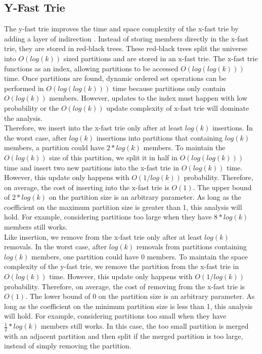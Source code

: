 \documentclass{article}
\begin{document}
\subsection{Y-Fast Trie}

\noindent
The y-fast trie improves the time and space complexity of the x-fast trie by adding a layer of indirection  \cite{WILLARD198381}. Instead of storing members directly in the x-fast trie, they are stored in red-black trees. These red-black trees split the universe into $O(log(k))$ sized partitions and are stored in an x-fast trie. The x-fast trie functions as an index, allowing partitions to be accessed $O(log(log(k)))$ time. Once partitions are found, dynamic ordered set operations can be performed in $O(log(log(k)))$ time because partitions only contain $O(log(k))$ members. However, updates to the index must happen with low probability or the $O(log(k))$ update complexity of x-fast trie will dominate the analysis.
\\

\noindent
Therefore, we insert into the x-fast trie only after at least $log(k)$ insertions. In the worst case, after $log(k)$ insertions into partitions that containing $log(k)$ members, a partition could have $2*log(k)$ members. To maintain the $O(log(k))$ size of this partition, we split it in half in $O(log(log(k)))$ time and insert two new partitions into the x-fast trie in $O(log(k))$ time. However, this update only happens with $O(1/log(k))$ probability. Therefore, on average, the cost of inserting into the x-fast trie is $O(1)$. The upper bound of $2*log(k)$ on the partition size is an arbitrary parameter. As long as the coefficient on the maximum partition size is greater than 1, this analysis will hold. For example, considering partitions too large when they have $8*log(k)$ members still works.
\\

\noindent
Like insertion, we remove from the x-fast trie only after at least $log(k)$ removals. In the worst case, after $log(k)$ removals from partitions containing $log(k)$ members, one partition could have $0$ members. To maintain the space complexity of the y-fast trie, we remove the partition from the x-fast trie in $O(log(k))$ time. However, this update only happens with $O(1/log(k))$ probability. Therefore, on average, the cost of removing from the x-fast trie is $O(1)$. The lower bound of $0$ on the partition size is an arbitrary parameter. As long as the coefficient on the minimum partition size is less than 1, this analysis will hold. For example, considering partitions too small when they have $\frac{1}{2}*log(k)$ members still works. In this case, the too small partition is merged with an adjacent partition and then split if the merged partition is too large, instead of simply removing the partition.
\\
\end{document}
